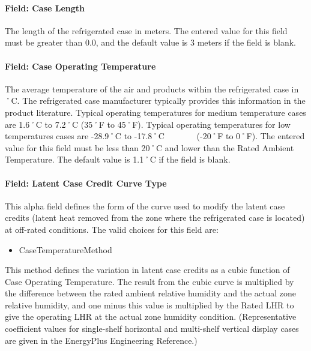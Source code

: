 \paragraph{Field: Case Length}\label{field-case-length}

The length of the refrigerated case in meters. The entered value for this field must be greater than 0.0, and the default value is 3 meters if the field is blank.

\paragraph{Field: Case Operating Temperature}\label{field-case-operating-temperature}

The average temperature of the air and products within the refrigerated case in ˚C. The refrigerated case manufacturer typically provides this information in the product literature. Typical operating temperatures for medium temperature cases are 1.6˚C to 7.2˚C (35˚F to 45˚F). Typical operating temperatures for low temperatures cases are -28.9˚C to -17.8˚C~~~~~~~ (-20˚F to 0˚F). The entered value for this field must be less than 20˚C and lower than the Rated Ambient Temperature. The default value is 1.1˚C if the field is blank.

\paragraph{Field: Latent Case Credit Curve Type}\label{field-latent-case-credit-curve-type}

This alpha field defines the form of the curve used to modify the latent case credits (latent heat removed from the zone where the refrigerated case is located) at off-rated conditions. The valid choices for this field are:

\begin{itemize}
\tightlist
\item
  CaseTemperatureMethod
\end{itemize}

This method defines the variation in latent case credits as a cubic function of Case Operating Temperature. The result from the cubic curve is multiplied by the difference between the rated ambient relative humidity and the actual zone relative humidity, and one minus this value is multiplied by the Rated LHR to give the operating LHR at the actual zone humidity condition. (Representative coefficient values for single-shelf horizontal and multi-shelf vertical display cases are given in the EnergyPlus Engineering Reference.)

